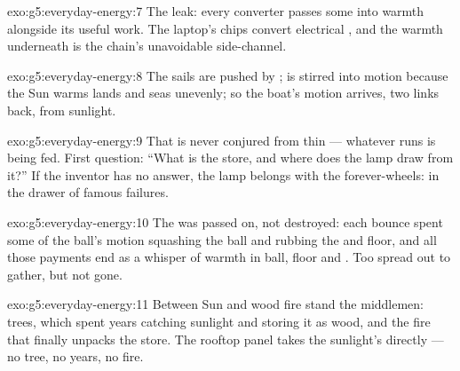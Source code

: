 \begin{solution}{exo:g5:everyday-energy:7}
The leak: every converter passes some  into warmth alongside
its useful work. The laptop's chips convert electrical , and
the warmth underneath is the chain's unavoidable side-channel.
\end{solution}

\begin{solution}{exo:g5:everyday-energy:8}
The sails are pushed by ;  is  stirred into motion
because the Sun warms lands and seas unevenly; so the boat's motion
 arrives, two links back, from sunlight.
\end{solution}

\begin{solution}{exo:g5:everyday-energy:9}
That  is never conjured from thin  --- whatever runs is
being fed. First question: ``What is the store, and where does the
lamp draw from it?'' If the inventor has no answer, the lamp
belongs with the forever-wheels: in the drawer of famous failures.
\end{solution}

\begin{solution}{exo:g5:everyday-energy:10}
The  was passed on, not destroyed: each bounce spent some of
the ball's motion  squashing the ball and rubbing the  and
floor, and all those payments end as a whisper of warmth in ball,
floor and . Too spread out to gather, but not gone.
\end{solution}

\begin{solution}{exo:g5:everyday-energy:11}
Between Sun and wood fire stand the middlemen: trees, which spent
years catching sunlight and storing it as wood, and the fire that
finally unpacks the store. The rooftop panel takes the sunlight's
 directly --- no tree, no years, no fire.
\end{solution}
